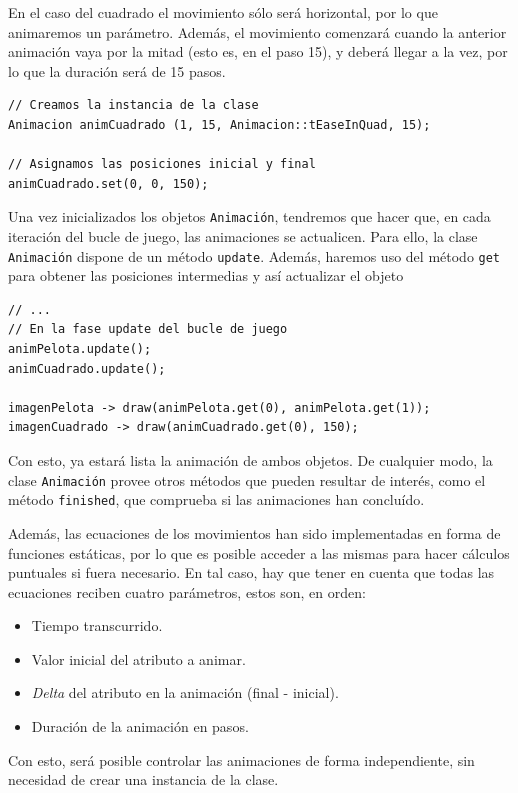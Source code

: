 En el caso del cuadrado el movimiento sólo será horizontal, por lo que
animaremos un parámetro. Además, el movimiento comenzará cuando la anterior
animación vaya por la mitad (esto es, en el paso 15), y deberá llegar a la vez,
por lo que la duración será de 15 pasos.

\begin{verbatim}
// Creamos la instancia de la clase
Animacion animCuadrado (1, 15, Animacion::tEaseInQuad, 15);

// Asignamos las posiciones inicial y final
animCuadrado.set(0, 0, 150);
\end{verbatim}

Una vez inicializados los objetos \texttt{Animación}, tendremos que hacer que,
en cada iteración del bucle de juego, las animaciones se actualicen. Para ello,
la clase \texttt{Animación} dispone de un método \texttt{update}. Además,
haremos uso del método \texttt{get} para obtener las posiciones intermedias y
así actualizar el objeto

\begin{verbatim}
// ...
// En la fase update del bucle de juego
animPelota.update();
animCuadrado.update();

imagenPelota -> draw(animPelota.get(0), animPelota.get(1));
imagenCuadrado -> draw(animCuadrado.get(0), 150);
\end{verbatim}

Con esto, ya estará lista la animación de ambos objetos. De cualquier modo, la
clase \texttt{Animación} provee otros métodos que pueden resultar de interés,
como el método \texttt{finished}, que comprueba si las animaciones han
concluído. 

Además, las ecuaciones de los movimientos han sido implementadas en forma de
funciones estáticas, por lo que es posible acceder a las mismas para hacer
cálculos puntuales si fuera necesario. En tal caso, hay que tener en cuenta que
todas las ecuaciones reciben cuatro parámetros, estos son, en orden:

\begin{itemize}
\item Tiempo transcurrido.
\item Valor inicial del atributo a animar.
\item \textit{Delta} del atributo en la animación (final - inicial).
\item Duración de la animación en pasos.
\end{itemize}

Con esto, será posible controlar las animaciones de forma independiente, sin
necesidad de crear una instancia de la clase.


